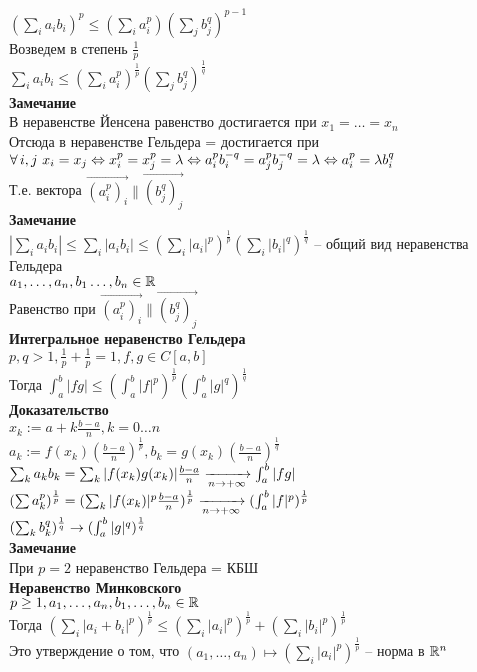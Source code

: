 \documentclass[12pt]{article}
\begin{document}
$(\sum_i a_i b_i)^p \leq (\sum_i a_i^p)(\sum_j b_j^q)^{p-1}$\\
Возведем в степень $\frac1p$\\
$\sum_i a_ib_i \leq (\sum_i a_i^p)^{\frac1p}(\sum_j b_j^q)^{\frac1q}$\\
\textbf{Замечание}\\
В неравенстве Йенсена равенство достигается при $x_1 = \ldots = x_n$\\
Отсюда в неравенстве Гельдера = достигается при $\forall\, i,j\ x_i = x_j \Leftrightarrow x_i^p = x_j^p = \lambda \Leftrightarrow a_i^pb_i^{-q} = a_j^pb_j^{-q} = \lambda \Leftrightarrow a_i^p = \lambda b_i^q$\\
Т.е. вектора $\vec{(a_i^p)_i} \| \vec{(b_j^q)_j}$\\
\textbf{Замечание}\\
$|\sum_i a_i b_i| \leq \sum_i |a_i b_i| \leq (\sum_i |a_i|^p)^{\frac1p}(\sum_i |b_i|^q)^{\frac1q}$ -- общий вид неравенства Гельдера\\
$a_1, \ldots, a_n, b_1 \ldots, b_n \in \mathbb{R}$\\
Равенство при $\vec{(a_i^p)_i} \| \vec{(b_j^q)_j}$\\
\textbf{Интегральное неравенство Гельдера}\\
$p,q > 1, \frac1p + \frac1p = 1, f,g \in C[a,b]$\\
Тогда $\int_a^b |fg| \leq (\int_a^b |f|^p)^{\frac1p}(\int_a^b |g|^q)^{\frac1q}$\\
\textbf{Доказательство}\\
$x_k := a+k\frac{b-a}n, k = 0\ldots n$\\
$a_k := f(x_k) (\frac{b-a}n)^{\frac1p}, b_k = g(x_k)(\frac{b-a}n)^{\frac1q}$\\
$\sum_k a_k b_k = \sum_k |f(x_k)g(x_k)|\frac{b-a}n \xrightarrow[n\rightarrow +\infty]{} \int_a^b |fg|$\\
$(\sum a_k^p)^{\frac1p} = (\sum_k |f(x_k)|^p \frac{b-a}n)^{\frac1p} \xrightarrow[n\rightarrow +\infty]{} (\int_a^b |f|^p)^\frac1p$\\
$(\sum_k b_k^q)^{\frac1q} \rightarrow (\int_a^b |g|^q)^{\frac1q}$\\
\textbf{Замечание}\\
При $p=2$ неравенство Гельдера = КБШ\\
\textbf{Неравенство Минковского}\\
$p\geq 1, a_1, \ldots, a_n, b_1, \ldots, b_n \in \mathbb{R}$\\
Тогда $(\sum_i |a_i+b_i|^p)^{\frac1p} \leq (\sum_i |a_i|^p)^{\frac1p} + (\sum_i |b_i|^p)^{\frac1p}$\\
Это утверждение о том, что $(a_1, \ldots, a_n) \mapsto (\sum_i |a_i|^p)^{\frac1p}$ -- норма в $\mathbb{R}^n$\\
\end{document}
